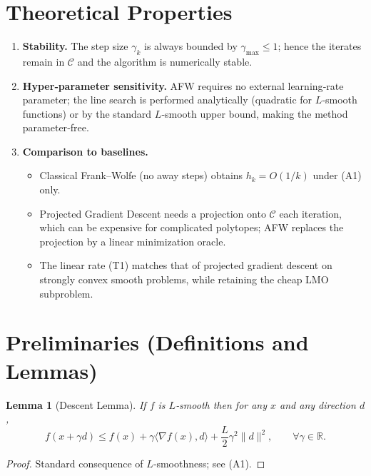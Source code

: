 \documentclass{article}
\newtheorem{lemma}{Lemma}
\newcommand{\R}{\mathbb{R}}
\begin{document}
\section*{Theoretical Properties}
\begin{enumerate}
\item \textbf{Stability.} The step size $\gamma_k$ is always bounded by $\gamma_{\max}\le1$;
hence the iterates remain in $\mathcal C$ and the algorithm is numerically stable.
\item \textbf{Hyper‑parameter sensitivity.} AFW requires no external learning‑rate
parameter; the line search is performed analytically (quadratic for $L$‑smooth
functions) or by the standard $L$‑smooth upper bound, making the method
parameter‑free.
\item \textbf{Comparison to baselines.}
\begin{itemize}
\item Classical Frank–Wolfe (no away steps) obtains $h_k=O(1/k)$ under (A1) only.
\item Projected Gradient Descent needs a projection onto $\mathcal C$ each
iteration, which can be expensive for complicated polytopes; AFW replaces the
projection by a linear minimization oracle.
\item The linear rate (T1) matches that of projected gradient descent on strongly
convex smooth problems, while retaining the cheap LMO subproblem.
\end{itemize}
\end{enumerate}

\section*{Preliminaries (Definitions and Lemmas)}
\begin{lemma}[Descent Lemma]\label{lem:descent}
If $f$ is $L$‑smooth then for any $x$ and any direction $d$,
\[
f(x+\gamma d)\le f(x)+\gamma\langle\nabla f(x),d\rangle
+\frac{L}{2}\gamma^{2}\|d\|^{2},
\qquad\forall\gamma\in\R .
\tag{L1}
\]
\end{lemma}
\begin{proof}
Standard consequence of $L$‑smoothness; see (A1). \hfill\qedhere
\end{proof}
\end{document}
